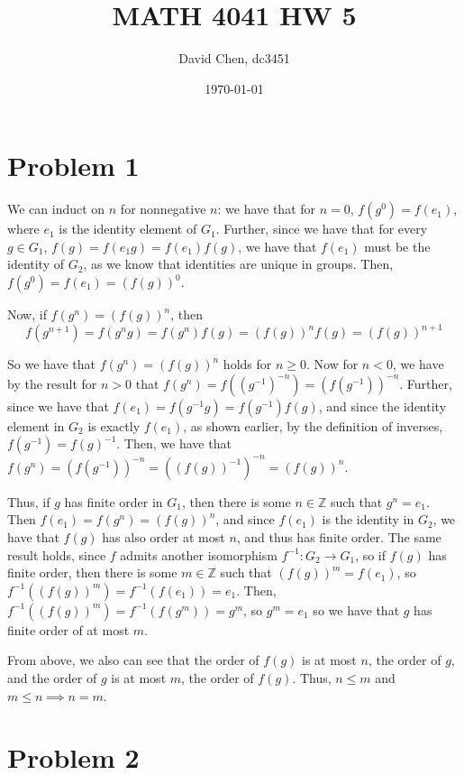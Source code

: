 \documentclass[12pt,letterpaper]{article}
\title{MATH 4041 HW 5}
\author{David Chen, dc3451}
\date{\today}
\theoremstyle{definition}
\newcommand{\Z}{\mathbb{Z}}
\begin{document}
\maketitle

\section*{Problem 1}

We can induct on \(n\) for nonnegative \(n\): we have that for \(n = 0\), \(f(g^{0}) = f(e_{1})\), where \(e_{1}\) is the identity element of \(G_{1}\). Further, since we have that for every \(g \in G_{1}\), \(f(g) = f(e_{1}  g) = f(e_{1})  f(g)\), we have that \(f(e_{1})\) must be the identity of \(G_{2}\), as we know that identities are unique in groups. Then, \(f(g^{0}) = f(e_{1}) = (f(g))^{0}\).

Now, if \(f(g^{n}) = (f(g))^{n}\), then
\[
  f(g^{n+1}) = f(g^{n}  g) = f(g^{n})  f(g) = (f(g))^{n}  f(g) = (f(g))^{n+1}
\]

So we have that \(f(g^{n}) = (f(g))^{n}\) holds for \(n \geq 0\). Now for \(n < 0\), we have by the result for \(n > 0\) that \(f(g^{n}) = f((g^{-1})^{-n}) = (f(g^{-1}))^{-n}\). Further, since we have that \(f(e_{1}) = f(g^{-1}  g) = f(g^{-1})  f(g)\), and since the identity element in \(G_{2}\) is exactly \(f(e_{1})\), as shown earlier, by the definition of inverses, \(f(g^{-1}) = f(g)^{-1}\). Then, we have that \(f(g^{n}) = (f(g^{-1}))^{-n} = ((f(g))^{-1})^{-n} = (f(g))^{n}\).

Thus, if \(g\) has finite order in \(G_{1}\), then there is some \(n \in \Z\) such that \(g^{n} = e_{1}\). Then \(f(e_{1}) = f(g^{n}) = (f(g))^{n}\), and since \(f(e_{1})\) is the identity in \(G_{2}\), we have that \(f(g)\) has also order at most \(n\), and thus has finite order. The same result holds, since \(f\) admits another isomorphism \(f^{-1}: G_{2} \rightarrow G_{1}\), so if \(f(g)\) has finite order, then there is some \(m \in \Z\) such that \((f(g))^{m} = f(e_{1})\), so \(f^{-1}((f(g))^{m}) = f^{-1}(f(e_{1})) = e_{1}\). Then, \(f^{-1}((f(g))^{m}) = f^{-1}(f(g^{m})) = g^{m}\), so \(g^{m} = e_{1}\) so we have that \(g\) has finite order of at most \(m\).

From above, we also can see that the order of \(f(g)\) is at most \(n\), the order of \(g\), and the order of \(g\) is at most \(m\), the order of \(f(g)\). Thus, \(n \leq m\) and \(m \leq n \implies n = m\).

\section*{Problem 2}
\end{document}
